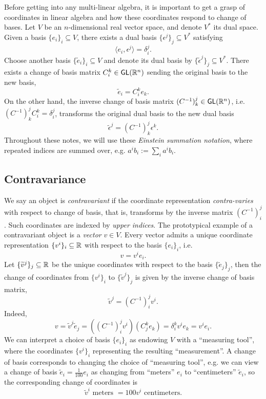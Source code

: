 Before getting into any multi-linear algebra, it is important to get a grasp of coordinates in linear algebra and how these coordinates respond to change of bases. Let $V$ be an $n$-dimensional real vector space, and denote $V^*$ its dual space. Given a basis $\{e_i\}_i \subseteq V$, there exists a dual basis $\{\epsilon^j\}_j \subseteq V^*$ satisfying 
	\[ \langle e_i, \epsilon^j \rangle = \delta^j_i. \]
Choose another basis $\{\widetilde e_i\}_i \subseteq V$ and denote its dual basis by $\{\widetilde \epsilon^j\}_j \subseteq V^*$. There exists a change of basis matrix $C^k_i \in \mathsf{GL} (\mathbb R^n)$ sending the original basis to the new basis,
	\[ \widetilde e_i = C^k_i e_k. \]	
On the other hand, the inverse change of basis matrix $(C^{-1})^j_k \in \mathsf{GL} (\mathbb R^n)$, i.e. $(C^{-1})^j_k C^k_i = \delta^j_i$, transforms the original dual basis to the new dual basis 	
	\[ \widetilde \epsilon^j = (C^{-1})^j_k \epsilon^k. \]
Throughout these notes, we will use these \emph{Einstein summation notation}, where repeated indices are summed over, e.g. $a^i b_i := \sum_i a^i b_i$.


\subsection{{Contravariance}}

We say an object is \emph{contravariant} if the coordinate representation \textit{contra-varies} with respect to change of basis, that is, transforms by the inverse matrix $(C^{-1})^j_i$. Such coordinates are indexed by \textit{upper indices}. The prototypical example of a contravariant object is a \emph{vector} $v \in V$. Every vector admits a unique coordinate representation $\{v^i\}_i \subseteq \mathbb R$ with respect to the basis $\{e_i\}_i$, i.e.
	\[ v = v^i e_i . \]
Let $\{ \widetilde v^j \}_j \subseteq \mathbb R$ be the unique coordinates with respect to the basis $\{\widetilde e_j\}_j$, then the change of coordinates from $\{v^i\}_i$ to $\{\widetilde v^j\}_j$ is given by the inverse change of basis matrix,
	\[ \widetilde v^j = {(C^{-1})}^j_i v^i. \]
Indeed, 	
	\[ v = \widetilde v^j \widetilde e_j  = \left( {(C^{-1})}^j_i v^i \right) \left( C^k_j e_k \right) = \delta^k_i v^i e_k = v^i e_i . \]
We can interpret a choice of basis $\{e_i\}_i$ as endowing $V$ with a ``measuring tool'', where the coordinates $\{v^i\}_i$ representing the resulting ``measurement''. A change of basis corresponds to changing the choice of ``measuring tool'', e.g. we can view a change of basis $\widetilde e_i = \tfrac{1}{100} e_i$ as changing from ``meters'' $e_i$ to ``centimeters'' $\widetilde e_i$, so the corresponding change of coordinates is 
	\[ \widetilde v^i \text{ meters } = 100 v^i \text{ centimeters}. \]




